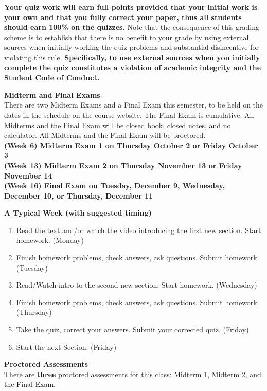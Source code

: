 \documentclass[12pt]{article}
\renewcommand{\emph}[1]{\textsf{\textbf{#1}}}
\newcommand{\localhead}[1]{\par\smallskip\textbf{#1} \smallskip\nobreak\\}%
\def\heading#1{\localhead{\large\emph{#1}}}
\begin{document}
\textbf{Your quiz work will earn full points provided that your initial work is your own and that you fully correct your paper, thus all students should earn 100\% on the quizzes.} Note that the consequence of this grading scheme is to establish that there is no benefit to your grade by using external sources when initially working the quiz problems and substantial disincentive for violating this rule. \textbf{Specifically, to use external sources when you initially complete the quiz constitutes a violation of academic integrity and the Student Code of Conduct. }

\heading{Midterm and Final Exams}
There are two Midterm Exams and a Final Exam this semester, to be held on the dates in the schedule on the course website. The Final Exam is cumulative. All Midterms and the Final Exam will be closed book, closed notes, and no calculator. All Midterms and the Final Exam will be proctored.\\

\emph{(Week 6) Midterm Exam 1 on Thursday October 2 or Friday October 3} \\
\emph{(Week 13) Midterm Exam 2 on Thursday November 13 or Friday November 14}  \\
\emph{(Week 16) Final Exam on Tuesday, December 9, Wednesday, December 10, or Thursday, December 11}\\ 

\heading{A Typical Week (with suggested timing)}
\vspace*{-.2in}
\begin{enumerate}
\item Read the text and/or watch the video introducing the first new section. Start homework.  (Monday)
\item Finish homework problems, check answers, ask questions. Submit homework.  (Tuesday)
\item Read/Watch intro to the second new section. Start homework.  (Wednesday)
\item Finish homework problems, check answers, ask questions. Submit homework. (Thursday)
\item Take the quiz, correct your answers. Submit your corrected quiz.  (Friday)
\item Start the next Section. (Friday)
\end{enumerate}

\heading{Proctored Assessments}
There are \emph{three} proctored assessments for this class:
Midterm 1, Midterm 2, and the Final Exam. 
\end{document}
